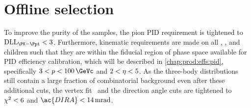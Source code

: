 \begin{table}
  \caption{%
    Requirements made in the \hlttwo\ \DTohhh\ selection.
    The \PDp and \PDsplus candidates are defined according to the three-body 
    mass window after the vertex fit.
    Cuts of the form $x > x_{1},\, x_{2},\, x_{3}$ require that all particles 
    satisfy $x > x_{1}$, at least two satisfy $x > x_{2}$, and at least one 
    satisfies $x > x_{3}$.
    The track \chisq\ criterion is applied in the reconstruction and listed 
    here for completeness.
  }
  \label{tab:prod:sel:online:hlt2_dtohhh_selection}
  \centering
  
\end{table}

\begin{table}
  \caption{%
    Requirements made in the \hlttwo\ \DstToDzpi\ selection.
    The input \PDzero\ candidates are those passing the \PDzero selection 
    defined in \cref{tab:prod:sel:online:hlt2_dztokpi_selection}.
    The track \chisq\ criterion is applied in the reconstruction and listed 
    here for completeness.
  }
  \label{tab:prod:sel:online:hlt2_dsttodzpi_selection}
  \centering
  
\end{table}

\section{Offline selection}
\label{chap:prod:sel:offline}

To improve the purity of the samples, the pion \ac{PID} requirement is 
tightened to $\dllkpi < 3$.
Furthermore, kinematic requirements are made on all \PDzero, \PDplus, and 
\PDsplus children such that they are within the fiducial region of phase space 
available for \ac{PID} efficiency calibration, which will be described in 
\cref{chap:prod:effs:pid}, specifically $3 < \ptot < \SI{100}{\GeVc}$ and $2 < 
\eta < 5$.
As the three-body distributions still contain a large fraction of combinatorial 
background even after these additional cuts, the vertex fit \chisq\ and the 
direction angle cuts are tightened to $\chi^2 < 6$ and $\ac{DIRA} < 
\SI{14}{\milli\radian}$.

